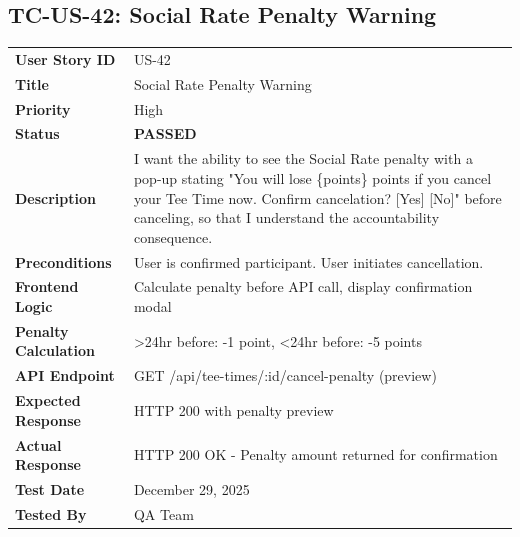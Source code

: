 \documentclass[11pt,a4paper]{article}
\newcommand{\passed}{\textcolor{pass}{\textbf{PASSED}}}
\begin{document}
\vspace{0.5cm}


\subsection{TC-US-42: Social Rate Penalty Warning}

\begin{tabularx}{\textwidth}{|p{3.2cm}|Y|}
\hline
{}
 \\
\hline
\textbf{User Story ID} & US-42 \\
\hline
\textbf{Title} & Social Rate Penalty Warning \\
\hline
\textbf{Priority} & High \\
\hline
\textbf{Status} & \passed \\
\hline
\textbf{Description} & I want the ability to see the Social Rate penalty with a pop-up stating "You will lose \{points\} points if you cancel your Tee Time now. Confirm cancelation? [Yes] [No]" before canceling, so that I understand the accountability consequence. \\
\hline
\textbf{Preconditions} & User is confirmed participant. User initiates cancellation. \\
\hline
\textbf{Frontend Logic} & Calculate penalty before API call, display confirmation modal \\
\hline
\textbf{Penalty Calculation} & >24hr before: -1 point, <24hr before: -5 points \\
\hline
\textbf{API Endpoint} & GET /api/tee-times/:id/cancel-penalty (preview) \\
\hline
\textbf{Expected Response} & HTTP 200 with penalty preview \\
\hline
\textbf{Actual Response} & HTTP 200 OK - Penalty amount returned for confirmation \\
\hline
\textbf{Test Date} & December 29, 2025 \\
\hline
\textbf{Tested By} & QA Team \\
\hline
\end{tabularx}
\end{document}
